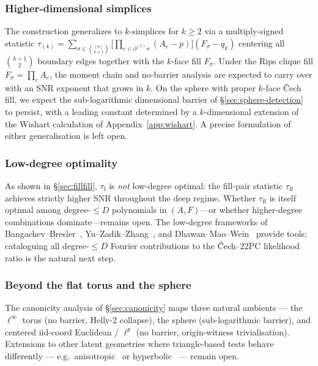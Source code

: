 \documentclass[reqno,12pt]{amsart}
\newcommand{\tauf}{\tau_{\mathrm{f}}}
\newcommand{\tauff}{\tau_{\mathrm{ff}}}
\newcommand{\PC}{\mathrm{2PC}}
\theoremstyle{plain}
\theoremstyle{definition}
\theoremstyle{remark}
\begin{document}
\subsubsection*{Higher-dimensional simplices}
The construction generalizes to $k$-simplices for $k\geq 2$ via a multiply-signed
statistic
\(
  \tau_{(k)} = \sum_{\sigma\in\binom{[n]}{k+1}}
    \bigl[\prod_{e\in\partial^{(1)}\sigma}(A_e - p)\bigr](F_\sigma - q_k)
\)
centering all $\binom{k+1}{2}$ boundary edges together with the $k$-face fill
$F_\sigma$. Under the Rips clique fill $F_\sigma = \prod_e A_e$, the moment chain
and no-barrier analysis are expected to carry over with an SNR exponent that
grows in $k$. On the sphere with proper $k$-face \v{C}ech fill, we expect the
sub-logarithmic dimensional barrier of \S\ref{sec:sphere-detection} to persist,
with a leading constant determined by a $k$-dimensional extension of the
Wishart calculation of Appendix~\ref{app:wishart}. A precise formulation of
either generalisation is left open.

\subsubsection*{Low-degree optimality}
As shown in \S\ref{sec:fillfill}, $\tauf$ is \emph{not} low-degree optimal: the fill-pair
statistic $\tauff$ achieves strictly higher SNR throughout the deep regime. Whether $\tauff$
is itself optimal among degree-$\leq D$ polynomials in $(A,F)$---or whether higher-degree
combinations dominate---remains open. The low-degree frameworks of
Bangachev--Bresler~\cite{BangachevBresler2024}, Yu--Zadik--Zhang~\cite{Yu2024},
and Dhawan--Mao--Wein~\cite{DhawanMaoWein2023} provide tools; cataloguing all
degree-$\leq D$ Fourier contributions to the \v{C}ech--$2\PC$ likelihood ratio is the
natural next step.

\subsubsection*{Beyond the flat torus and the sphere}
The canonicity analysis of \S\ref{sec:canonicity} maps three natural ambients --- the
$\ell^\infty$ torus (no barrier, Helly-2 collapse), the sphere (sub-logarithmic
barrier), and centered iid-coord Euclidean / $\ell^p$ (no barrier, origin-witness
trivialisation). Extensions to other latent geometries where triangle-based tests
behave differently --- e.g.\ anisotropic~\cite{Brennan2022} or
hyperbolic~\cite{Litvak2022} --- remain open.

\end{document}
